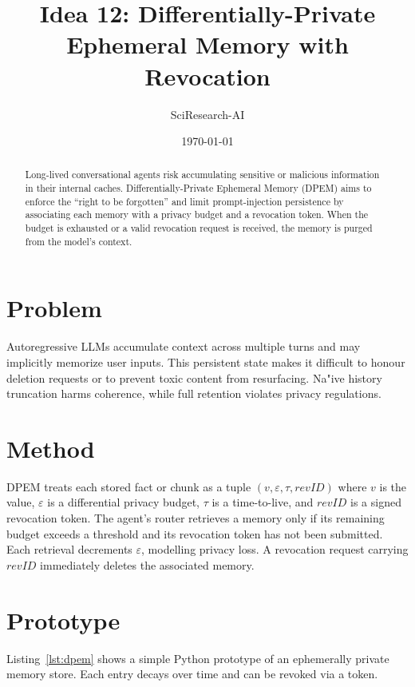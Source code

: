 \documentclass{article}
\title{Idea 12: Differentially-Private Ephemeral Memory with Revocation}
\author{SciResearch-AI}
\date{\today}
\begin{document}
\maketitle

\begin{abstract}
Long-lived conversational agents risk accumulating sensitive or malicious information in their internal caches.  Differentially-Private Ephemeral Memory (DPEM) aims to enforce the ``right to be forgotten'' and limit prompt‑injection persistence by associating each memory with a privacy budget and a revocation token.  When the budget is exhausted or a valid revocation request is received, the memory is purged from the model's context.
\end{abstract}

\section{Problem}
Autoregressive LLMs accumulate context across multiple turns and may implicitly memorize user inputs.  This persistent state makes it difficult to honour deletion requests or to prevent toxic content from resurfacing.  Na{"i}ve history truncation harms coherence, while full retention violates privacy regulations.

\section{Method}
DPEM treats each stored fact or chunk as a tuple $(v,\varepsilon,\tau,\mathit{revID})$ where $v$ is the value, $\varepsilon$ is a differential privacy budget, $\tau$ is a time-to-live, and $\mathit{revID}$ is a signed revocation token.  The agent's router retrieves a memory only if its remaining budget exceeds a threshold and its revocation token has not been submitted.  Each retrieval decrements $\varepsilon$, modelling privacy loss.  A revocation request carrying $\mathit{revID}$ immediately deletes the associated memory.

\section{Prototype}
Listing~\ref{lst:dpem} shows a simple Python prototype of an ephemerally private memory store.  Each entry decays over time and can be revoked via a token.
\end{document}
